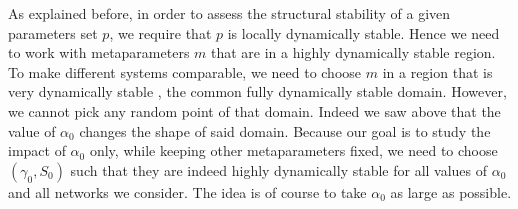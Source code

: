 \documentclass[12pt, titlepage]{report}
\begin{document}
As explained before, in order to assess the structural stability of a given parameters set $p$, we require that $p$ is locally dynamically stable. Hence we need to work with metaparameters $m$ that are in a highly dynamically stable region. %
To make different systems comparable, we need to choose $m$ in a region that is very dynamically stable , \eg the common fully dynamically stable domain. However, we cannot pick any random point of that domain.
Indeed we saw above that the value of $\alpha_0$ changes the shape of said domain. Because our goal is to study the impact of $\alpha_0$ only, while keeping other metaparameters fixed,
we need to choose $(\gamma_0, S_0)$ such that they are indeed highly dynamically stable
for all values of $\alpha_0$ and all networks we consider. The idea is of course to take $\alpha_0$ as large as possible.
\end{document}
